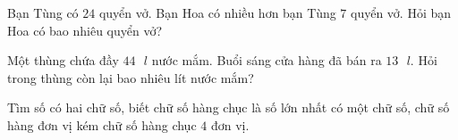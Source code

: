 \begin{bt}[1,5 điểm]
Bạn Tùng có $24$ quyển vở. Bạn Hoa có nhiều hơn bạn Tùng $7$ quyển vở. Hỏi bạn Hoa có bao nhiêu quyển vở?
\end{bt}

\begin{bt}[1,0 điểm]
Một thùng chứa đầy $44\text{ }l$ nước mắm. Buổi sáng cửa hàng đã bán ra $13\text{ }l$. Hỏi trong thùng còn lại bao nhiêu lít nước mắm?
\end{bt}

\begin{bt}[1,0 điểm]
Tìm số có hai chữ số, biết chữ số hàng chục là số lớn nhất có một chữ số, chữ số hàng đơn vị kém chữ số hàng chục $4$ đơn vị.
\end{bt}
